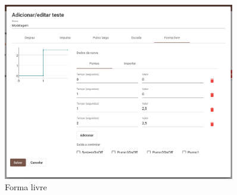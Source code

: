\begin{figure}[ht!]
    \centering
    \includegraphics[width=0.9\textwidth]{imgs/system-response7}
    \caption[Forma livre]{Forma livre}%
    \label{fig:system-response7}
\end{figure}
